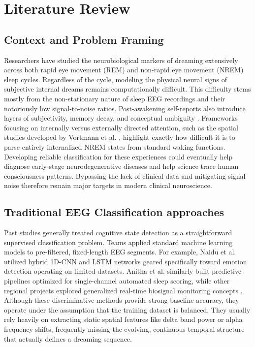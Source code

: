 \documentclass[journal,10pt,twocolumn]{IEEEtran}
\begin{document}
\section{Literature Review}

\subsection{Context and Problem Framing}
Researchers have studied the neurobiological markers of dreaming extensively across both rapid eye movement (REM) and non-rapid eye movement (NREM) sleep cycles. Regardless of the cycle, modeling the physical neural signs of subjective internal dreams remains computationally difficult. This difficulty stems mostly from the non-stationary nature of sleep EEG recordings and their notoriously low signal-to-noise ratios. Post-awakening self-reports also introduce layers of subjectivity, memory decay, and conceptual ambiguity \cite{siclari2018dreaming}. Frameworks focusing on internally versus externally directed attention, such as the spatial studies developed by Vortmann et al. \cite{10.3389/fnhum.2019.00348}, highlight exactly how difficult it is to parse entirely internalized NREM states from standard waking functions. Developing reliable classification for these experiences could eventually help diagnose early-stage neurodegenerative diseases and help science trace human consciousness patterns. Bypassing the lack of clinical data and mitigating signal noise therefore remain major targets in modern clinical neuroscience.

\subsection{Traditional EEG Classification approaches}
Past studies generally treated cognitive state detection as a straightforward supervised classification problem. Teams applied standard machine learning models to pre-filtered, fixed-length EEG segments. For example, Naidu et al. \cite{naidu2024emotion} utilized hybrid 1D-CNN and LSTM networks geared specifically toward emotion detection operating on limited datasets. Anitha et al. \cite{anitha2024efficient} similarly built predictive pipelines optimized for single-channel automated sleep scoring, while other regional projects explored generalized real-time biosignal monitoring concepts \cite{amrita2022eeg, amrita2025single}. Although these discriminative methods provide strong baseline accuracy, they operate under the assumption that the training dataset is balanced. They usually rely heavily on extracting static spatial features like delta band power or alpha frequency shifts, frequently missing the evolving, continuous temporal structure that actually defines a dreaming sequence.
\end{document}
